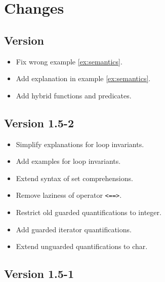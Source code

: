 \section{Changes}

\subsection{Version \version}

\begin{itemize}
\item Fix wrong example \ref{ex:semantics}.
\item Add explanation in example \ref{ex:semantics}.
\item Add hybrid functions and predicates.
\end{itemize}

\subsection{Version 1.5-2}

\begin{itemize}
\item Simplify explanations for loop invariants.
\item Add examples for loop invariants.
\item Extend syntax of set comprehensions.
\item Remove laziness of operator \lstinline|<==>|.
\item Restrict old guarded quantifications to integer.
\item Add guarded iterator quantifications.
\item Extend unguarded quantifications to char.
\end{itemize}

\subsection{Version 1.5-1}

